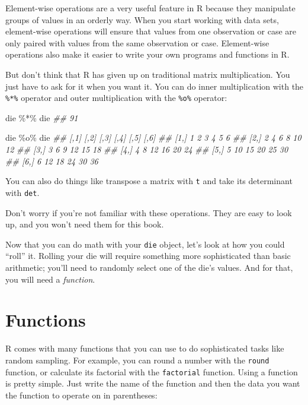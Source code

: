 \documentclass[
  letterpaper,
  DIV=11,
  numbers=noendperiod]{scrbook}
\newenvironment{Shaded}{\begin{snugshade}}{\end{snugshade}}
\newcommand{\DocumentationTok}[1]{\textcolor[rgb]{0.37,0.37,0.37}{\textit{#1}}}
\newcommand{\NormalTok}[1]{\textcolor[rgb]{0.00,0.23,0.31}{#1}}
\newcommand{\SpecialCharTok}[1]{\textcolor[rgb]{0.37,0.37,0.37}{#1}}
\begin{document}
Element-wise operations are a very useful feature in R because they
manipulate groups of values in an orderly way. When you start working
with data sets, element-wise operations will ensure that values from one
observation or case are only paired with values from the same
observation or case. Element-wise operations also make it easier to
write your own programs and functions in R.

But don't think that R has given up on traditional matrix
multiplication. You just have to ask for it when you want it. You can do
inner multiplication with the \texttt{\%*\%} operator and outer
multiplication with the \texttt{\%o\%} operator:

\begin{Shaded}
\begin{Highlighting}[]
\NormalTok{die }\SpecialCharTok{\%*\%}\NormalTok{ die}
\DocumentationTok{\#\# 91}

\NormalTok{die }\SpecialCharTok{\%o\%}\NormalTok{ die}
\DocumentationTok{\#\#      [,1] [,2] [,3] [,4] [,5] [,6]}
\DocumentationTok{\#\# [1,]    1    2    3    4    5    6}
\DocumentationTok{\#\# [2,]    2    4    6    8   10   12}
\DocumentationTok{\#\# [3,]    3    6    9   12   15   18}
\DocumentationTok{\#\# [4,]    4    8   12   16   20   24}
\DocumentationTok{\#\# [5,]    5   10   15   20   25   30}
\DocumentationTok{\#\# [6,]    6   12   18   24   30   36}
\end{Highlighting}
\end{Shaded}

You can also do things like transpose a matrix with \texttt{t} and take
its determinant with \texttt{det}.

Don't worry if you're not familiar with these operations. They are easy
to look up, and you won't need them for this book.

Now that you can do math with your \texttt{die} object, let's look at
how you could ``roll'' it. Rolling your die will require something more
sophisticated than basic arithmetic; you'll need to randomly select one
of the die's values. And for that, you will need a \emph{function}.

\section{Functions}\label{functions}

R comes with many functions that you can use to do sophisticated tasks
like random sampling. For example, you can round a number with the
\texttt{round} function, or calculate its factorial with the
\texttt{factorial} function. Using a function is pretty simple. Just
write the name of the function and then the data you want the function
to operate on in parentheses:
\end{document}
